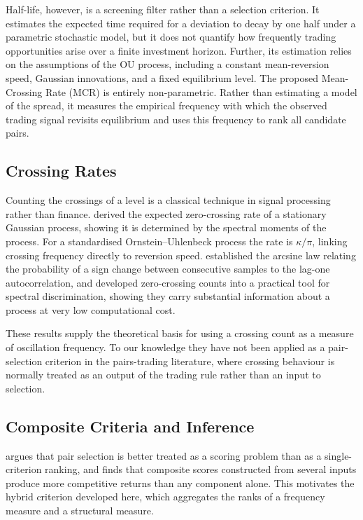 \documentclass[11pt,a4paper]{article}
\theoremstyle{definition}
\begin{document}
Half-life, however, is a screening filter rather than a selection criterion. It
estimates the expected time required for a deviation to decay by one half under a
parametric stochastic model, but it does not quantify how frequently trading
opportunities arise over a finite investment horizon. Further, its estimation
relies on the assumptions of the OU process, including a constant mean-reversion
speed, Gaussian innovations, and a fixed equilibrium level. The proposed
Mean-Crossing Rate (MCR) is entirely non-parametric. Rather than estimating a
model of the spread, it measures the empirical frequency with which the observed
trading signal revisits equilibrium and uses this frequency to rank all candidate
pairs.

\subsection{Crossing Rates}

Counting the crossings of a level is a classical technique in signal processing
rather than finance. \citet{rice1944} derived the expected zero-crossing rate of
a stationary Gaussian process, showing it is determined by the spectral moments
of the process. For a standardised Ornstein--Uhlenbeck process the rate is
$\kappa/\pi$, linking crossing frequency directly to reversion speed.
\citet{vanvleck1966} established the arcsine law relating the probability of a
sign change between consecutive samples to the lag-one autocorrelation, and
\citet{kedem1986} developed zero-crossing counts into a practical tool for
spectral discrimination, showing they carry substantial information about a
process at very low computational cost.

These results supply the theoretical basis for using a crossing count as a
measure of oscillation frequency. To our knowledge they have not been applied as
a pair-selection criterion in the pairs-trading literature, where crossing
behaviour is normally treated as an output of the trading rule rather than an
input to selection.

\subsection{Composite Criteria and Inference}

\citet{reichmann2026} argues that pair selection is better treated as a scoring
problem than as a single-criterion ranking, and finds that composite scores
constructed from several inputs produce more competitive returns than any
component alone. This motivates the hybrid criterion developed here, which
aggregates the ranks of a frequency measure and a structural measure.
\end{document}
